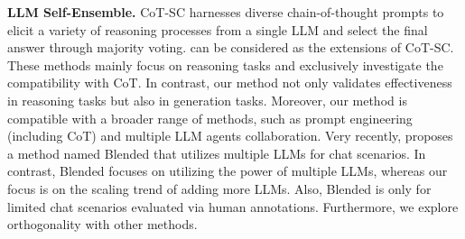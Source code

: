 \textbf{LLM Self-Ensemble.} CoT-SC \cite{cotsc} harnesses diverse chain-of-thought \cite{cot} prompts to elicit a variety of reasoning processes from a single LLM and select the final answer through majority voting. \citet{complexity-cot, diverse, verifier, lamda, self-agreement} can be considered as the extensions of CoT-SC. These methods mainly focus on reasoning tasks and exclusively investigate the compatibility with CoT. In contrast, our method not only validates effectiveness in reasoning tasks but also in generation tasks. Moreover, our method is compatible with a broader range of methods, such as prompt engineering (including CoT) and multiple LLM agents collaboration. Very recently, \citet{llm-blending} proposes a method named Blended that utilizes multiple LLMs for chat scenarios. In contrast, Blended focuses on utilizing the power of multiple LLMs, whereas our focus is on the scaling trend of adding more LLMs. Also, Blended is only for limited chat scenarios evaluated via human annotations. Furthermore, we explore orthogonality with other methods.







